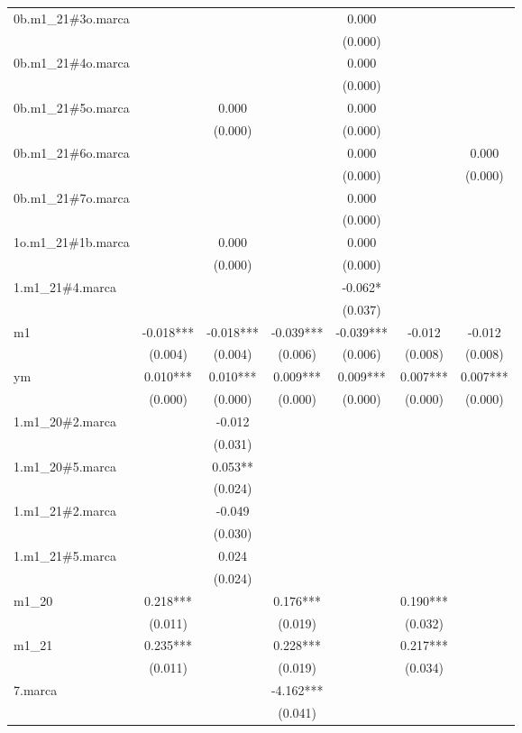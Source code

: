 \begin{tabular}{lcccccc}
0b.m1\_21\#3o.marca &  &  &  & 0.000 &  &  \\
 &  &  &  & (0.000) &  &  \\
0b.m1\_21\#4o.marca &  &  &  & 0.000 &  &  \\
 &  &  &  & (0.000) &  &  \\
0b.m1\_21\#5o.marca &  & 0.000 &  & 0.000 &  &  \\
 &  & (0.000) &  & (0.000) &  &  \\
0b.m1\_21\#6o.marca &  &  &  & 0.000 &  & 0.000 \\
 &  &  &  & (0.000) &  & (0.000) \\
0b.m1\_21\#7o.marca &  &  &  & 0.000 &  &  \\
 &  &  &  & (0.000) &  &  \\
1o.m1\_21\#1b.marca &  & 0.000 &  & 0.000 &  &  \\
 &  & (0.000) &  & (0.000) &  &  \\
1.m1\_21\#4.marca &  &  &  & -0.062* &  &  \\
 &  &  &  & (0.037) &  &  \\
m1 & -0.018*** & -0.018*** & -0.039*** & -0.039*** & -0.012 & -0.012 \\
 & (0.004) & (0.004) & (0.006) & (0.006) & (0.008) & (0.008) \\
ym & 0.010*** & 0.010*** & 0.009*** & 0.009*** & 0.007*** & 0.007*** \\
 & (0.000) & (0.000) & (0.000) & (0.000) & (0.000) & (0.000) \\
1.m1\_20\#2.marca &  & -0.012 &  &  &  &  \\
 &  & (0.031) &  &  &  &  \\
1.m1\_20\#5.marca &  & 0.053** &  &  &  &  \\
 &  & (0.024) &  &  &  &  \\
1.m1\_21\#2.marca &  & -0.049 &  &  &  &  \\
 &  & (0.030) &  &  &  &  \\
1.m1\_21\#5.marca &  & 0.024 &  &  &  &  \\
 &  & (0.024) &  &  &  &  \\
m1\_20 & 0.218*** &  & 0.176*** &  & 0.190*** &  \\
 & (0.011) &  & (0.019) &  & (0.032) &  \\
m1\_21 & 0.235*** &  & 0.228*** &  & 0.217*** &  \\
 & (0.011) &  & (0.019) &  & (0.034) &  \\
7.marca &  &  & -4.162*** &  &  &  \\
 &  &  & (0.041) &  &  &  \\

\end{tabular}
